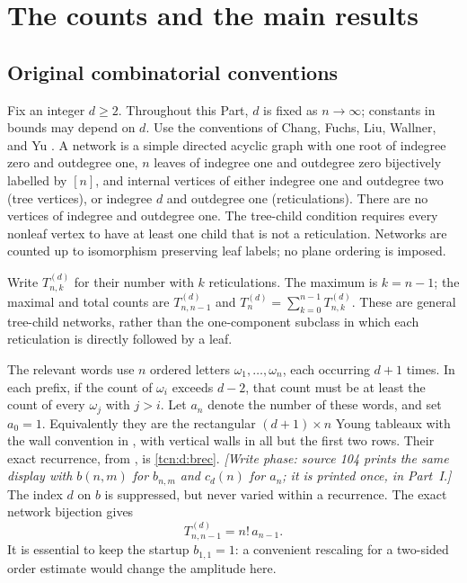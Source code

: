\documentclass[11pt,letterpaper]{article}
\theoremstyle{remark}
\begin{document}
\section{The counts and the main results}\label{tcn:f:sec:results}
\subsection{Original combinatorial conventions}
Fix an integer $d\ge2$. Throughout this Part, $d$ is fixed as $n\to\infty$; constants in bounds may depend on $d$. Use the conventions of Chang, Fuchs, Liu, Wallner, and Yu \cite{Chang2024}. A network is a simple directed acyclic graph with one root of indegree zero and outdegree one, $n$ leaves of indegree one and outdegree zero bijectively labelled by $[n]$, and internal vertices of either indegree one and outdegree two (tree vertices), or indegree $d$ and outdegree one (reticulations). There are no vertices of indegree and outdegree one. The tree-child condition requires every nonleaf vertex to have at least one child that is not a reticulation. Networks are counted up to isomorphism preserving leaf labels; no plane ordering is imposed.

Write $T^{(d)}_{n,k}$ for their number with $k$ reticulations. The maximum is $k=n-1$; the maximal and total counts are $T^{(d)}_{n,n-1}$ and $T^{(d)}_n=\sum_{k=0}^{n-1}T^{(d)}_{n,k}$. These are general tree-child networks, rather than the one-component subclass in which each reticulation is directly followed by a leaf.

The relevant words use $n$ ordered letters $\omega_1,\ldots,\omega_n$, each occurring $d+1$ times. In each prefix, if the count of $\omega_i$ exceeds $d-2$, that count must be at least the count of every $\omega_j$ with $j>i$. Let $a_n$ denote the number of these words, and set $a_0=1$. Equivalently they are the rectangular $(d+1)\times n$ Young tableaux with the wall convention in \cite[Remark 3.3]{Chang2024}, with vertical walls in all but the first two rows. Their exact recurrence, from \cite[(17)]{Chang2024}, is \eqref{tcn:d:brec}. \emph{[Write phase: source 104 prints the same display with $b(n,m)$ for $b_{n,m}$ and $c_d(n)$ for $a_n$; it is printed once, in Part~I.]} The index $d$ on $b$ is suppressed, but never varied within a recurrence. The exact network bijection gives
\begin{equation}\label{tcn:f:maximalidentity}
 T^{(d)}_{n,n-1}=n!\,a_{n-1}.
\end{equation}
It is essential to keep the startup $b_{1,1}=1$: a convenient rescaling for a two-sided order estimate would change the amplitude here.
\end{document}
